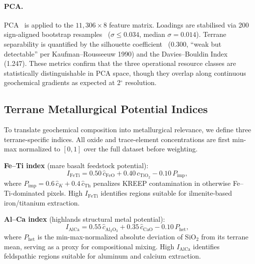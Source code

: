 \documentclass[11pt,a4paper]{article}
\begin{document}
\paragraph{PCA.}
PCA~\cite{Jolliffe2002} is applied to the $11{,}306 \times 8$ feature matrix. Loadings are stabilised via 200 sign-aligned bootstrap resamples~\cite{EfronTibshirani1993} ($\sigma \leq 0.034$, median $\sigma = 0.014$). Terrane separability is quantified by the silhouette coefficient~\cite{Rousseeuw1987} (0.300, ``weak but detectable'' per Kaufman--Rousseeuw 1990) and the Davies--Bouldin Index~\cite{DaviesBouldin1979} (1.247). These metrics confirm that the three operational resource classes are statistically distinguishable in PCA space, though they overlap along continuous geochemical gradients as expected at 2$^\circ$ resolution.

\subsection{Terrane Metallurgical Potential Indices}

To translate geochemical composition into metallurgical relevance, we define three terrane-specific indices. All oxide and trace-element concentrations are first min-max normalized to $[0, 1]$ over the full dataset before weighting.

\textbf{Fe--Ti index} (mare basalt feedstock potential):
\begin{equation}
I_{\mathrm{FeTi}} = 0.50\,\hat{c}_{\mathrm{FeO}} + 0.40\,\hat{c}_{\mathrm{TiO_2}} - 0.10\,P_{\mathrm{imp}},
\label{eq:IFeTi}
\end{equation}
where $P_{\mathrm{imp}} = 0.6\,\hat{c}_K + 0.4\,\hat{c}_{\mathrm{Th}}$ penalizes KREEP contamination in otherwise Fe--Ti-dominated pixels. High $I_{\mathrm{FeTi}}$ identifies regions suitable for ilmenite-based iron/titanium extraction.

\textbf{Al--Ca index} (highlands structural metal potential):
\begin{equation}
I_{\mathrm{AlCa}} = 0.55\,\hat{c}_{\mathrm{Al_2O_3}} + 0.35\,\hat{c}_{\mathrm{CaO}} - 0.10\,P_{\mathrm{het}},
\label{eq:IAlCa}
\end{equation}
where $P_{\mathrm{het}}$ is the min-max-normalized absolute deviation of SiO$_2$ from its terrane mean, serving as a proxy for compositional mixing. High $I_{\mathrm{AlCa}}$ identifies feldspathic regions suitable for aluminum and calcium extraction.
\end{document}
